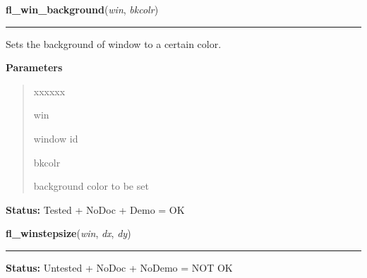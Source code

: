 \hspace{.8\funcindent}\begin{boxedminipage}{\funcwidth}

    \raggedright \textbf{fl\_win\_background}(\textit{win}, \textit{bkcolr})

    \vspace{-1.5ex}

    \rule{\textwidth}{0.5\fboxrule}
\setlength{\parskip}{2ex}
    Sets the background of window to a certain color.

\setlength{\parskip}{1ex}
      \textbf{Parameters}
      \vspace{-1ex}

      \begin{quote}
        \begin{Ventry}{xxxxxx}

          \item[win]

          window id

          \item[bkcolr]

          background color to be set

        \end{Ventry}

      \end{quote}

\textbf{Status:} Tested + NoDoc + Demo = OK



    \end{boxedminipage}

    \label{xformslib:library:fl_winstepsize}

    \vspace{0.5ex}

\hspace{.8\funcindent}\begin{boxedminipage}{\funcwidth}

    \raggedright \textbf{fl\_winstepsize}(\textit{win}, \textit{dx}, \textit{dy})

    \vspace{-1.5ex}

    \rule{\textwidth}{0.5\fboxrule}
\setlength{\parskip}{2ex}
\setlength{\parskip}{1ex}
\textbf{Status:} Untested + NoDoc + NoDemo = NOT OK



    \end{boxedminipage}

